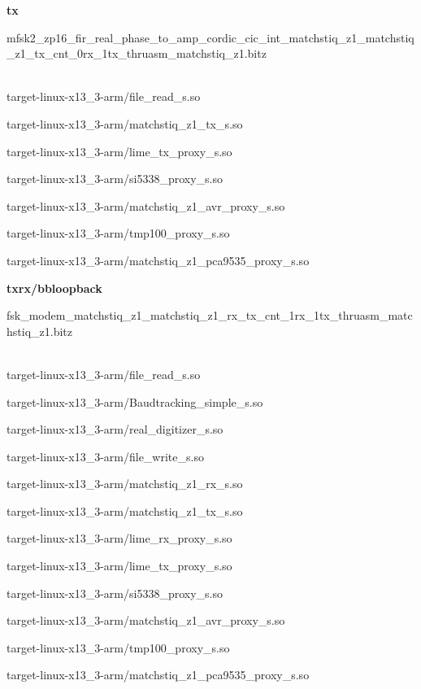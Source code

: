 	\noindent\textbf{tx}
	\begin{itemize}
	\item
mfsk2\_zp16\_fir\_real\_phase\_to\_amp\_cordic\_cic\_int\_matchstiq\_z1\_matchstiq\_z1\_tx\_cnt\_0rx\_1tx\_thruasm\_matchstiq\_z1.bitz	\\ \\
	\begin{minipage}[t]{.5\textwidth}
	\item target-linux-x13\_3-arm/file\_read\_s.so
	\item target-linux-x13\_3-arm/matchstiq\_z1\_tx\_s.so
	\item target-linux-x13\_3-arm/lime\_tx\_proxy\_s.so
	\item target-linux-x13\_3-arm/si5338\_proxy\_s.so
	\end{minipage}
	\begin{minipage}[t]{.5\textwidth}
	\item target-linux-x13\_3-arm/matchstiq\_z1\_avr\_proxy\_s.so
	\item target-linux-x13\_3-arm/tmp100\_proxy\_s.so
	\item target-linux-x13\_3-arm/matchstiq\_z1\_pca9535\_proxy\_s.so
	\end{minipage}
	\end{itemize}

	\noindent\textbf{txrx/bbloopback}
	\begin{itemize}
	\item fsk\_modem\_matchstiq\_z1\_matchstiq\_z1\_rx\_tx\_cnt\_1rx\_1tx\_thruasm\_matchstiq\_z1.bitz \\ \\
	\begin{minipage}[t]{.5\textwidth}
	\item target-linux-x13\_3-arm/file\_read\_s.so
	\item target-linux-x13\_3-arm/Baudtracking\_simple\_s.so
	\item target-linux-x13\_3-arm/real\_digitizer\_s.so
	\item target-linux-x13\_3-arm/file\_write\_s.so
	\item target-linux-x13\_3-arm/matchstiq\_z1\_rx\_s.so
	\item target-linux-x13\_3-arm/matchstiq\_z1\_tx\_s.so
	\end{minipage}
	\begin{minipage}[t]{.5\textwidth}
	\item target-linux-x13\_3-arm/lime\_rx\_proxy\_s.so
	\item target-linux-x13\_3-arm/lime\_tx\_proxy\_s.so
	\item target-linux-x13\_3-arm/si5338\_proxy\_s.so
	\item target-linux-x13\_3-arm/matchstiq\_z1\_avr\_proxy\_s.so
	\item target-linux-x13\_3-arm/tmp100\_proxy\_s.so
	\item target-linux-x13\_3-arm/matchstiq\_z1\_pca9535\_proxy\_s.so
	\end{minipage}
	\end{itemize}
